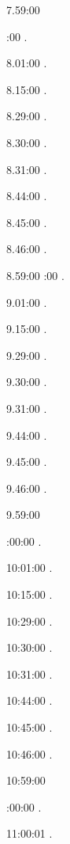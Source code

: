 7.59:00 

:00 .

8.01:00 . 

8.15:00 . 

8.29:00 . 

8.30:00 .

8.31:00 .

8.44:00 .

8.45:00 .

8.46:00 .

8.59:00 
:00 .

9.01:00 . 

9.15:00 . 

9.29:00 . 

9.30:00 .

9.31:00 .

9.44:00 .

9.45:00 .

9.46:00 .

9.59:00 

:00:00 .

10:01:00 . 

10:15:00 . 

10:29:00 . 

10:30:00 .

10:31:00 .

10:44:00 .

10:45:00 .

10:46:00 .

10:59:00 

:00:00 .

11:00:01 .

